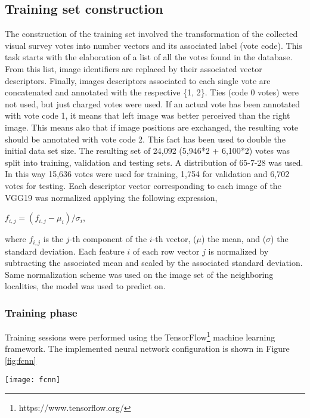 \documentclass{llncs}
\begin{document}
\subsection{Training set construction} 
The construction of the training set involved the transformation of the collected visual survey votes into number vectors and its associated label (vote code). This task starts with the elaboration of a list of all the votes found in the database. From this list, image identifiers are replaced by their associated vector descriptors. Finally, images descriptors associated to each single vote are concatenated and annotated with the respective \{1, 2\}. Ties (code 0 votes) were not used, but just charged votes were used. If an actual vote has been annotated with vote code 1, it means that left image was better perceived than the right image. This means also that if image positions are exchanged, the resulting vote should be annotated with vote code 2.  This fact has been used to double the initial data set size. The resulting set of 24,092 (5,946*2 + 6,100*2) votes was split into training, validation and testing sets. A distribution of 65-7-28 was used. In this way 15,636 votes were used for training, 1,754 for validation and 6,702 votes for testing. Each descriptor vector corresponding to each image of the VGG19 was normalized applying the following expression,
\begin{center}
$ f_{i,j}=(f_{i,j}-\mu_{i})/\sigma_{i}$,
\end{center}
where $f_{i,j}$ is the $j$-th component of the $i$-th vector, ($\mu$) the mean, and ($\sigma$) the standard deviation. Each feature $i$ of each row vector $j$ is normalized by subtracting the associated mean and scaled by the associated standard deviation. Same normalization scheme was used on the image set of the neighboring localities, the model was used to predict on.

\subsubsection{Training phase}
Training sessions were performed using the TensorFlow\footnote{https://www.tensorflow.org/} machine learning framework. The implemented neural network configuration is shown in Figure \ref{fig:fcnn}

\begin{center}
	\centering
	\texttt{[image: fcnn]}
	\label{fig:fcnn}
\end{center}
\end{document}
